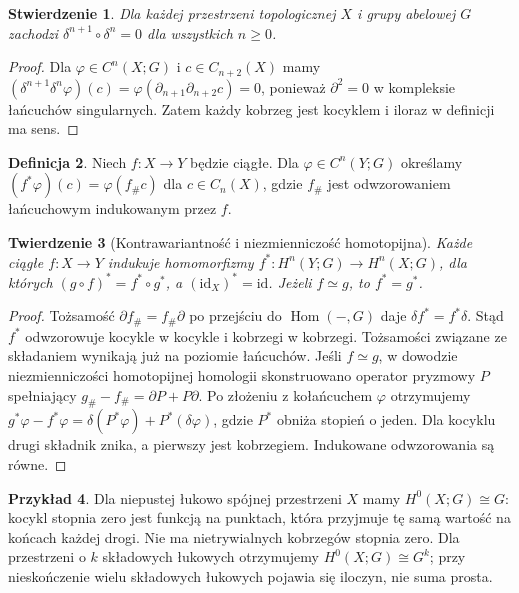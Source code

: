 \documentclass[11pt,a4paper,oneside]{report}
\newcommand{\id}{\mathrm{id}}
\theoremstyle{plain}
\newtheorem{twierdzenie}{Twierdzenie}[section]
\newtheorem{stwierdzenie}[twierdzenie]{Stwierdzenie}
\theoremstyle{definition}
\newtheorem{definicja}[twierdzenie]{Definicja}
\newtheorem{przyklad}[twierdzenie]{Przykład}
\theoremstyle{remark}
\begin{document}
\begin{stwierdzenie}
Dla każdej przestrzeni topologicznej $X$ i grupy abelowej $G$
zachodzi $\delta^{n+1}\circ\delta^n=0$ dla wszystkich $n\geq0$.
\end{stwierdzenie}
\begin{proof}
Dla $\varphi\in C^n(X;G)$ i $c\in C_{n+2}(X)$ mamy
$(\delta^{n+1}\delta^n\varphi)(c)
=\varphi(\partial_{n+1}\partial_{n+2}c)=0$,
ponieważ $\partial^2=0$ w kompleksie łańcuchów singularnych.
Zatem każdy kobrzeg jest kocyklem i iloraz w definicji ma sens.
\end{proof}

\begin{definicja}
Niech $f:X\to Y$ będzie ciągłe. Dla $\varphi\in C^n(Y;G)$
określamy $(f^*\varphi)(c)=\varphi(f_\#c)$ dla $c\in C_n(X)$,
gdzie $f_\#$ jest odwzorowaniem łańcuchowym indukowanym przez $f$.
\end{definicja}

\begin{twierdzenie}[Kontrawariantność i niezmienniczość homotopijna]
Każde ciągłe $f:X\to Y$ indukuje homomorfizmy
$f^*:H^n(Y;G)\to H^n(X;G)$, dla których
$(g\circ f)^*=f^*\circ g^*$, a $(\id_X)^*=\id$.
Jeżeli $f\simeq g$, to $f^*=g^*$.
\end{twierdzenie}
\begin{proof}
Tożsamość $\partial f_\#=f_\#\partial$ po przejściu do
$\operatorname{Hom}(-,G)$ daje $\delta f^*=f^*\delta$.
Stąd $f^*$ odwzorowuje kocykle w kocykle i kobrzegi w kobrzegi.
Tożsamości związane ze składaniem wynikają już na poziomie łańcuchów.
Jeśli $f\simeq g$, w dowodzie niezmienniczości homotopijnej
homologii skonstruowano operator pryzmowy $P$ spełniający
$g_\#-f_\#=\partial P+P\partial$.
Po złożeniu z kołańcuchem $\varphi$ otrzymujemy
$g^*\varphi-f^*\varphi=\delta(P^*\varphi)+P^*(\delta\varphi)$,
gdzie $P^*$ obniża stopień o jeden. Dla kocyklu drugi składnik znika,
a pierwszy jest kobrzegiem. Indukowane odwzorowania są równe.
\end{proof}

\begin{przyklad}
Dla niepustej łukowo spójnej przestrzeni $X$ mamy $H^0(X;G)\cong G$:
kocykl stopnia zero jest funkcją na punktach, która przyjmuje tę samą
wartość na końcach każdej drogi. Nie ma nietrywialnych kobrzegów
stopnia zero. Dla przestrzeni o $k$ składowych łukowych otrzymujemy
$H^0(X;G)\cong G^k$; przy nieskończenie wielu składowych
łukowych pojawia się iloczyn, nie suma prosta.
\end{przyklad}
\end{document}
